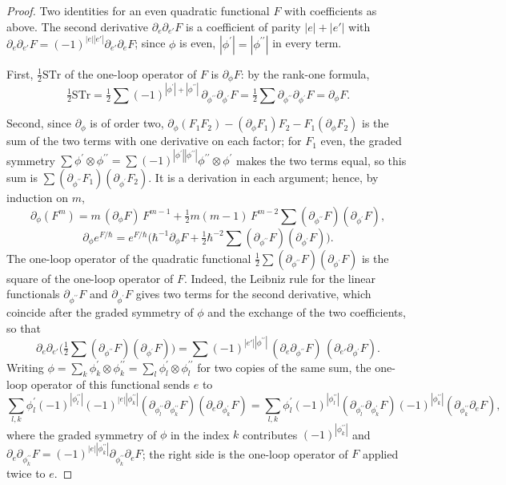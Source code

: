 \begin{proof}
Two identities for an even quadratic functional $F$ with coefficients as above. The second derivative $\partial_e\partial_{e'}F$ is a coefficient of parity $|e|+|e'|$ with $\partial_e\partial_{e'}F=(-1)^{|e||e'|}\partial_{e'}\partial_eF$; since $\phi$ is even, $|\phi^{\prime}|=|\phi^{\prime\prime}|$ in every term.

First, $\tfrac12\mathrm{STr}$ of the one-loop operator of $F$ is $\partial_\phi F$: by the rank-one formula,
\[
\tfrac12\mathrm{STr}=\tfrac12\sum(-1)^{|\phi^{\prime}|+|\phi^{\prime\prime}|}\,\partial_{\phi^{\prime\prime}}\partial_{\phi^{\prime}}F=\tfrac12\sum\partial_{\phi^{\prime\prime}}\partial_{\phi^{\prime}}F=\partial_\phi F .
\]

Second, since $\partial_\phi$ is of order two, $\partial_\phi(F_1F_2)-(\partial_\phi F_1)F_2-F_1(\partial_\phi F_2)$ is the sum of the two terms with one derivative on each factor; for $F_1$ even, the graded symmetry $\sum\phi^{\prime}\otimes\phi^{\prime\prime}=\sum(-1)^{|\phi^{\prime}||\phi^{\prime\prime}|}\phi^{\prime\prime}\otimes\phi^{\prime}$ makes the two terms equal, so this sum is $\sum(\partial_{\phi^{\prime\prime}}F_1)(\partial_{\phi^{\prime}}F_2)$. It is a derivation in each argument; hence, by induction on $m$,
\[
\partial_\phi(F^m)=m\,(\partial_\phi F)\,F^{m-1}+\tfrac12m(m-1)\,F^{m-2}\sum(\partial_{\phi^{\prime\prime}}F)(\partial_{\phi^{\prime}}F),
\]
\[
\partial_\phi e^{F/\hbar}=e^{F/\hbar}\Big(\hbar^{-1}\partial_\phi F+\tfrac12\hbar^{-2}\sum(\partial_{\phi^{\prime\prime}}F)(\partial_{\phi^{\prime}}F)\Big).
\]
The one-loop operator of the quadratic functional $\tfrac12\sum(\partial_{\phi^{\prime\prime}}F)(\partial_{\phi^{\prime}}F)$ is the square of the one-loop operator of $F$. Indeed, the Leibniz rule for the linear functionals $\partial_{\phi^{\prime\prime}}F$ and $\partial_{\phi^{\prime}}F$ gives two terms for the second derivative, which coincide after the graded symmetry of $\phi$ and the exchange of the two coefficients, so that
\[
\partial_e\partial_{e'}\Big(\tfrac12\sum(\partial_{\phi^{\prime\prime}}F)(\partial_{\phi^{\prime}}F)\Big)=\sum(-1)^{|e'||\phi^{\prime\prime}|}\,(\partial_e\partial_{\phi^{\prime\prime}}F)\,(\partial_{e'}\partial_{\phi^{\prime}}F).
\]
Writing $\phi=\sum_k\phi^{\prime}_k\otimes\phi^{\prime\prime}_k=\sum_l\phi^{\prime}_l\otimes\phi^{\prime\prime}_l$ for two copies of the same sum, the one-loop operator of this functional sends $e$ to
\[
\sum_{l,k}\phi^{\prime}_l(-1)^{|\phi^{\prime\prime}_l|}(-1)^{|e||\phi^{\prime\prime}_k|}(\partial_{\phi^{\prime\prime}_l}\partial_{\phi^{\prime\prime}_k}F)(\partial_e\partial_{\phi^{\prime}_k}F)=\sum_{l,k}\phi^{\prime}_l(-1)^{|\phi^{\prime\prime}_l|}(\partial_{\phi^{\prime\prime}_l}\partial_{\phi^{\prime}_k}F)(-1)^{|\phi^{\prime\prime}_k|}(\partial_{\phi^{\prime\prime}_k}\partial_eF),
\]
where the graded symmetry of $\phi$ in the index $k$ contributes $(-1)^{|\phi^{\prime\prime}_k|}$ and $\partial_e\partial_{\phi^{\prime\prime}_k}F=(-1)^{|e||\phi^{\prime\prime}_k|}\partial_{\phi^{\prime\prime}_k}\partial_eF$; the right side is the one-loop operator of $F$ applied twice to $e$.


\end{proof}
